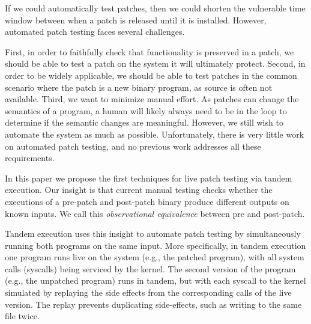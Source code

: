 
If we could automatically test patches, then we could shorten the
vulnerable time window between when a patch is released until it
is installed. However, automated patch testing faces several challenges.

First, in order to faithfully check that functionality is preserved in
a patch, we should be able to test a patch on the system it will
ultimately protect.  Second, in order to be widely applicable, we
should be able to test patches in the common scenario where the patch
is a new binary program, as source is often not available. Third, we
want to minimize manual effort. As patches can change the semantics of
a program, a human will likely always need to be in the loop to
determine if the semantic changes are meaningful. However, we still
wish to automate the system as much as possible.  Unfortunately, there
is very little work on automated patch testing, and no previous work
addresses all these requirements.


In this paper we propose the first techniques for live patch testing
via tandem execution. Our insight is that current manual testing
checks whether the executions of a pre-patch and post-patch binary
produce different outputs on known inputs.  We call this
\emph{observational equivalence} between pre and post-patch.

Tandem execution uses this insight to automate patch testing by
simultaneously running both programs on the same input.  More
specifically, in tandem execution one program runs live on the
system (e.g., the patched program), with all system calls (syscalls)
being serviced by the kernel. The second version of the program (e.g.,
the unpatched program) runs in tandem, but with each syscall to the
kernel simulated by replaying the side effects from the corresponding
calls of the live version.  The replay prevents duplicating
side-effects, such as writing to the same file twice.

